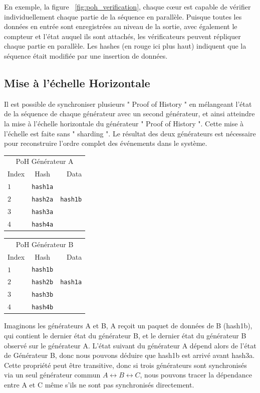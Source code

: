 \documentclass[12pt]{article}
\begin{document}
En exemple, la figure ~\ref{fig:poh_verification}, chaque cœur est capable de vérifier individuellement chaque partie de la séquence en parallèle. Puisque toutes les données en entrée sont enregistrées au niveau de la sortie, avec également le compteur et l'état auquel ils sont attachés, les vérificateurs peuvent répliquer chaque partie en parallèle. Les hashes (en rouge ici plus haut) indiquent que la séquence était modifiée par une insertion de données.

\subsection{Mise à l'échelle Horizontale}\label{poh:mise_echelle}
Il est possible de synchroniser plusieurs " Proof of History " en mélangeant
l'état de la séquence de chaque générateur avec un second générateur, et ainsi atteindre
la mise à l'échelle horizontale du générateur " Proof of History ". Cette mise à l'échelle est faite
sans " sharding ". Le résultat des deux générateurs est nécessaire pour reconstruire
l'ordre complet des événements dans le système.

\begin{center}
  \begin{tabular}{|l c r|}

  \hline
    \multicolumn{3}{|c|}{PoH Générateur  A} \\
    Index & Hash & Data \\ \hline
    $1$ & \texttt{hash1a} & \\
    $2$ & \texttt{hash2a} & \texttt{hash1b} \\
    $3$ & \texttt{hash3a} & \\
    $4$ & \texttt{hash4a} & \\
    \hline
    \end{tabular}
  \begin{tabular}{| l  c  r |}
  \hline
    \multicolumn{3}{|c|}{PoH Générateur B} \\
    Index & Hash & Data \\ \hline
    $1$ & \texttt{hash1b} & \\
    $2$ & \texttt{hash2b} & \texttt{hash1a} \\
    $3$ & \texttt{hash3b} & \\
    $4$ & \texttt{hash4b} & \\
    \hline
    \end{tabular}
\end{center}

Imaginons les générateurs A et B, A reçoit un paquet de données de B (hash1b), qui contient le dernier état du générateur B, et le dernier état du générateur B observé sur le générateur A. L'état suivant du générateur A dépend alors de l'état de Générateur B, donc nous pouvons déduire que hash1b est arrivé avant hash3a. Cette propriété peut être transitive, donc si trois générateurs sont synchronisés via un seul générateur commun \(A \leftrightarrow B \leftrightarrow C \), nous pouvons tracer la dépendance entre A et C même s'ils ne sont pas synchronisés directement.
\end{document}
